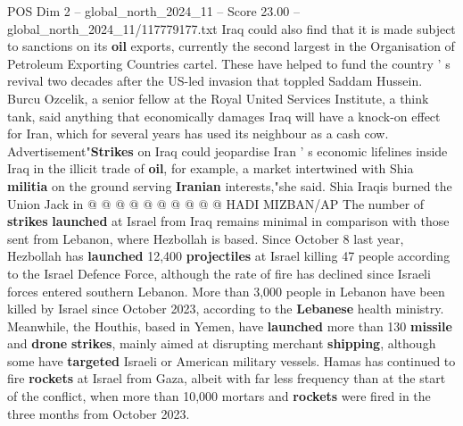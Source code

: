 \begin{textsample}{POS Dim 2 – global\_north\_2024\_11 – Score 23.00 – global\_north\_2024\_11/117779177.txt}
Iraq could also find that it is made subject to sanctions on its \textbf{oil} exports, currently the second largest in the Organisation of Petroleum Exporting Countries cartel.
These have helped to fund the country ' s revival two decades after the US-led invasion that toppled Saddam Hussein.
Burcu Ozcelik, a senior fellow at the Royal United Services Institute, a think tank, said anything that economically damages Iraq will have a knock-on effect for Iran, which for several years has used its neighbour as a cash cow.
Advertisement"\textbf{Strikes} on Iraq could jeopardise Iran ' s economic lifelines inside Iraq in the illicit trade of \textbf{oil}, for example, a market intertwined with Shia \textbf{militia} on the ground serving \textbf{Iranian} interests,"she said.
Shia Iraqis burned the Union Jack in @ @ @ @ @ @ @ @ @ @ HADI MIZBAN/AP The number of \textbf{strikes} \textbf{launched} at Israel from Iraq remains minimal in comparison with those sent from Lebanon, where Hezbollah is based.
Since October 8 last year, Hezbollah has \textbf{launched} 12,400 \textbf{projectiles} at Israel killing 47 people according to the Israel Defence Force, although the rate of fire has declined since Israeli forces entered southern Lebanon.
More than 3,000 people in Lebanon have been killed by Israel since October 2023, according to the \textbf{Lebanese} health ministry.
Meanwhile, the Houthis, based in Yemen, have \textbf{launched} more than 130 \textbf{missile} and \textbf{drone} \textbf{strikes}, mainly aimed at disrupting merchant \textbf{shipping}, although some have \textbf{targeted} Israeli or American military vessels.
Hamas has continued to fire \textbf{rockets} at Israel from Gaza, albeit with far less frequency than at the start of the conflict, when more than 10,000 mortars and \textbf{rockets} were fired in the three months from October 2023.

\end{textsample}
